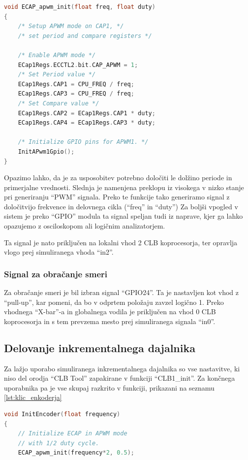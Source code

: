 \documentclass[a4paper]{article}
\begin{document}
\begin{sloppypar}
\begin{lstlisting}[language=C,
                   caption={Implementacija funkcije za usposobitev ``eCAP'' 
                            modula v ``apwm'' načinu},
                   label={lst:ecap_init}]
void ECAP_apwm_init(float freq, float duty)
{
    /* Setup APWM mode on CAP1, */
    /* set period and compare registers */

    /* Enable APWM mode */
    ECap1Regs.ECCTL2.bit.CAP_APWM = 1;
    /* Set Period value */
    ECap1Regs.CAP1 = CPU_FREQ / freq;
    ECap1Regs.CAP3 = CPU_FREQ / freq;
    /* Set Compare value */
    ECap1Regs.CAP2 = ECap1Regs.CAP1 * duty;
    ECap1Regs.CAP4 = ECap1Regs.CAP3 * duty;

    /* Initialize GPIO pins for APWM1. */
    InitAPwm1Gpio();
}
\end{lstlisting}

Opazimo lahko, da je za usposobitev potrebno določiti le dolžino periode in
primerjalne vrednosti. Slednja je namenjena preklopu iz visokega v nizko stanje
pri generiranju ``PWM'' signala. Preko te funkcije tako generiramo signal z
določitvijo frekvence in delovnega cikla (``freq'' in ``duty'') Za boljši
vpogled v sistem je preko ``GPIO'' modula ta signal speljan tudi iz naprave,
kjer ga lahko opazujemo z osciloskopom ali logičnim analizatorjem.

Ta signal je nato priključen na lokalni vhod 2 CLB koprocesorja, ter opravlja
vlogo prej simuliranega vhoda ``in2''.

\subsubsection{Signal za obračanje smeri}
Za obračanje smeri je bil izbran signal ``GPIO24''. Ta je nastavljen kot vhod z
``pull-up'', kar pomeni, da bo v odprtem položaju zavzel logično 1. Preko
vhodnega ``X-bar''-a in globalnega vodila je priključen na vhod 0 CLB
koprocesorja in s tem prevzema mesto prej simuliranega signala ``in0''.

\subsection{Delovanje inkrementalnega dajalnika}
Za lažjo uporabo simuliranega inkrementalnega dajalnika so vse nastavitve, ki
niso del orodja ``CLB Tool'' zapakirane v funkciji ``CLB1\_init''. Za končnega
uporabnika pa je vse skupaj razkrito v funkciji, prikazani na seznamu
\ref{lst:klic_enkoderja}

\begin{lstlisting}[language=C,
                   caption={Implementacija funkcije za nastavitev 
                            inkrementalnega dajalnika},
                   label={lst:klic_enkoderja}]
void InitEncoder(float frequency)
{
    // Initialize ECAP in APWM mode
    // with 1/2 duty cycle.
    ECAP_apwm_init(frequency*2, 0.5);


\end{lstlisting}
\end{sloppypar}
\end{document}
